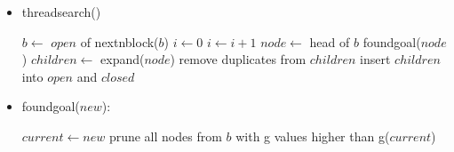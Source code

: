 \documentclass{article}
\begin{document}
\begin{itemize}
  \item threadsearch()
  \begin{algorithmic}[1]
    \STATE $b \leftarrow$ $open$ of nextnblock($b$)
    \STATE $i \leftarrow 0$
      \STATE $i \leftarrow i+1$
      \STATE $node \leftarrow$ head of $b$
        \STATE foundgoal($node$)
        \STATE $children \leftarrow$ expand($node$)
        \STATE remove duplicates from $children$
        \STATE insert $children$ into $open$ and $closed$
      \ENDIF
    \ENDWHILE
  \ENDWHILE
  \end{algorithmic}

  \item foundgoal($new$):
  \begin{algorithmic}[1]
        \STATE $current \leftarrow new$
        \STATE prune all nodes from $b$ with g values higher than g($current$)
      \ENDIF
  \end{algorithmic}
\end{itemize}
\end{document}
